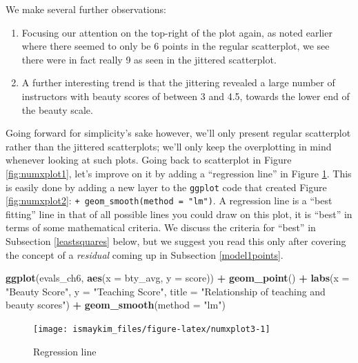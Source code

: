 \documentclass[12pt,]{krantz}
\makeatletter
\newenvironment{Shaded}{\begin{snugshade}}{\end{snugshade}}
\newcommand{\KeywordTok}[1]{\textcolor[rgb]{0.27,0.27,0.27}{\textbf{#1}}}
\newcommand{\DataTypeTok}[1]{\textcolor[rgb]{0.27,0.27,0.27}{#1}}
\newcommand{\StringTok}[1]{\textcolor[rgb]{0.5,0.5,0.5}{#1}}
\newcommand{\OperatorTok}[1]{\textcolor[rgb]{0.43,0.43,0.43}{\textbf{#1}}}
\newcommand{\NormalTok}[1]{#1}
\providecommand{\tightlist}{%
  \setlength{\itemsep}{0pt}\setlength{\parskip}{0pt}}
\newenvironment{kframe}{%
\medskip{}
\setlength{\fboxsep}{.8em}
 \def\at@end@of@kframe{}%
 \ifinner\ifhmode%
  \def\at@end@of@kframe{\end{minipage}}%
  \begin{minipage}{\columnwidth}%
 \fi\fi%
 \def\FrameCommand##1{\hskip\@totalleftmargin \hskip-\fboxsep
 \colorbox{shadecolor}{##1}\hskip-\fboxsep
     \hskip-\linewidth \hskip-\@totalleftmargin \hskip\columnwidth}%
 \MakeFramed {\advance\hsize-\width
   \@totalleftmargin\z@ \linewidth\hsize
   \@setminipage}}%
 {\par\unskip\endMakeFramed%
 \at@end@of@kframe}
\renewenvironment{Shaded}{\begin{kframe}}{\end{kframe}}
\makeatother
\begin{document}
We make several further observations:

\begin{enumerate}
\def\labelenumi{\arabic{enumi}.}
\tightlist
\item
  Focusing our attention on the top-right of the plot again, as noted
  earlier where there seemed to only be 6 points in the regular
  scatterplot, we see there were in fact really 9 as seen in the
  jittered scatterplot.
\item
  A further interesting trend is that the jittering revealed a large
  number of instructors with beauty scores of between 3 and 4.5, towards
  the lower end of the beauty scale.
\end{enumerate}

Going forward for simplicity's sake however, we'll only present regular
scatterplot rather than the jittered scatterplots; we'll only keep the
overplotting in mind whenever looking at such plots. Going back to
scatterplot in Figure \ref{fig:numxplot1}, let's improve on it by adding
a ``regression line'' in Figure \ref{fig:numxplot3}. This is easily done
by adding a new layer to the \texttt{ggplot} code that created Figure
\ref{fig:numxplot2}: \texttt{+\ geom\_smooth(method\ =\ "lm")}. A
regression line is a ``best fitting'' line in that of all possible lines
you could draw on this plot, it is ``best'' in terms of some
mathematical criteria. We discuss the criteria for ``best'' in
Subsection \ref{leastsquares} below, but we suggest you read this only
after covering the concept of a \emph{residual} coming up in Subsection
\ref{model1points}.

\begin{Shaded}
\begin{Highlighting}[]
\KeywordTok{ggplot}\NormalTok{(evals_ch6, }\KeywordTok{aes}\NormalTok{(}\DataTypeTok{x =}\NormalTok{ bty_avg, }\DataTypeTok{y =}\NormalTok{ score)) }\OperatorTok{+}
\StringTok{  }\KeywordTok{geom_point}\NormalTok{() }\OperatorTok{+}
\StringTok{  }\KeywordTok{labs}\NormalTok{(}\DataTypeTok{x =} \StringTok{"Beauty Score"}\NormalTok{, }\DataTypeTok{y =} \StringTok{"Teaching Score"}\NormalTok{, }
       \DataTypeTok{title =} \StringTok{"Relationship of teaching and beauty scores"}\NormalTok{) }\OperatorTok{+}\StringTok{  }
\StringTok{  }\KeywordTok{geom_smooth}\NormalTok{(}\DataTypeTok{method =} \StringTok{"lm"}\NormalTok{)}
\end{Highlighting}
\end{Shaded}

\begin{figure}

{\centering \texttt{[image: ismaykim\_files/figure-latex/numxplot3-1]} 

}

\caption{Regression line}\label{fig:numxplot3}
\end{figure}
\end{document}
